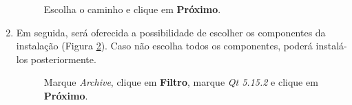 \documentclass[a4paper,11pt]{article}
\newcommand{\qtfive}{\textit{Qt 5.15.2}}
\begin{document}
\begin{enumerate}
\begin{figure}[H]
	\centering
	\caption{ Escolha o caminho e clique em \textbf{Próximo}.}
	\label{fig:qt_download_path}
\end{figure}

\item Em seguida, será oferecida a possibilidade de escolher os componentes da instalação (Figura \ref{fig:qt_5_15_2_install}). Caso não escolha todos os componentes, poderá instalá-los posteriormente.

\begin{figure}[H]
	\centering
	\caption{Marque \textit{Archive}, clique em \textbf{Filtro}, marque \qtfive{} e clique em \textbf{Próximo}.}
	\label{fig:qt_5_15_2_install}
\end{figure}


\end{enumerate}
\end{document}
